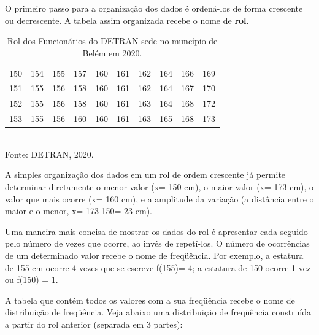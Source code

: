 \newpage

O primeiro passo para a organização dos dados é ordená-los de forma crescente ou decrescente. A tabela assim organizada recebe o nome de \textbf{rol}.


\begin{table}[!htb]
    \centering
    {
    \caption{Rol dos Funcionários do DETRAN sede no muncípio de Belém em 2020.}
    \label{estatura2}
    \vspace{0.2cm}
\begin{tabular}{c|c|c|c|c|c|c|c|c|c}
  \hline\hline
  150 & 154 & 155 & 157 & 160 & 161 & 162 & 164 & 166 & 169 \\
  151 & 155 & 156 & 158 & 160 & 161 & 162 & 164 & 167 & 170 \\
  152 & 155 & 156 & 158 & 160 & 161 & 163 & 164 & 168 & 172 \\
  153 & 155 & 156 & 160 & 160 & 161 & 163 & 165 & 168 & 173 \\
  \hline\hline
\end{tabular}}
\\
\hspace{-6.5cm} Fonte: DETRAN, 2020.
\end{table}



A simples organização dos dados em um rol de ordem crescente já permite determinar diretamente o menor valor (x= 150 cm), o maior valor (x= 173 cm), o valor que mais ocorre (x= 160 cm), e a amplitude da variação (a distância entre o maior e o menor, x= 173-150= 23 cm).\vskip0.3cm


Uma maneira mais concisa de mostrar os dados do rol é apresentar cada seguido pelo número de vezes que ocorre, ao invés de repetí-los. O número de ocorrências de um determinado valor recebe o nome de freqüência. Por exemplo, a estatura de 155 cm ocorre 4 vezes que se escreve f(155)= 4; a estatura de 150 ocorre 1 vez ou f(150) = 1.\vskip0.3cm


A tabela que contém todos os valores com a sua freqüência recebe o nome de distribuição de freqüência. Veja abaixo uma distribuição de freqüência construída a partir do rol anterior (separada em 3 partes):

